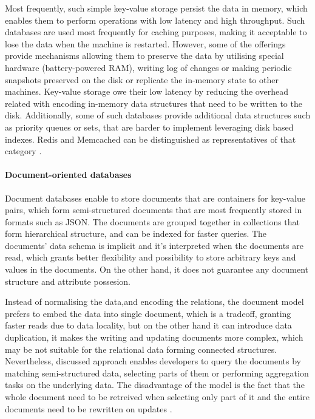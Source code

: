 Most frequently, such simple key-value storage persist the data in memory, which enables them to perform operations with low latency and high throughput. Such databases are used most frequently for caching purposes, making it acceptable to lose the data when the machine is restarted. However, some of the offerings provide mechanisms allowing them to preserve the data by utilising special hardware (battery-powered RAM), writing log of changes or making periodic snapshots preserved on the disk or replicate the in-memory state to other machines. Key-value storage owe their low latency by reducing the overhead related with encoding in-memory data structures that need to be written to the disk. Additionally, some of such databases provide additional data structures such as priority queues or sets, that are harder to implement leveraging disk based indexes. Redis \cite{Redis} and Memcached \cite{Memcached} can be distinguished as representatives of that category \cite{DesignDataIntensiveApplications}. 

\paragraph*{Document-oriented databases}

Document databases enable to store documents that are containers for key-value pairs, which form semi-structured documents that are most frequently stored in formats such as JSON. The documents are grouped together in collections that form hierarchical structure, and can be indexed for faster queries. The documents' data schema is implicit and it's interpreted when the documents are read, which grants better flexibility and possibility to store arbitrary keys and values in the documents. On the other hand, it does not guarantee any document structure and attribute possesion.

Instead of normalising the data,and encoding the relations, the document model prefers to embed the data into single document, which is a tradeoff, granting faster reads due to data locality, but on the other hand it can introduce data duplication, it makes the writing and updating documents more complex, which may be not suitable for the relational data forming connected structures. Nevertheless, discussed approach enables developers to query the documents by matching semi-structured data, selecting parts of them or performing aggregation tasks on the underlying data. 
The disadvantage of the model is the fact that the whole document need to be retreived when selecting only part of it and the entire documents need to be rewritten on updates \cite{DesignDataIntensiveApplications}.

